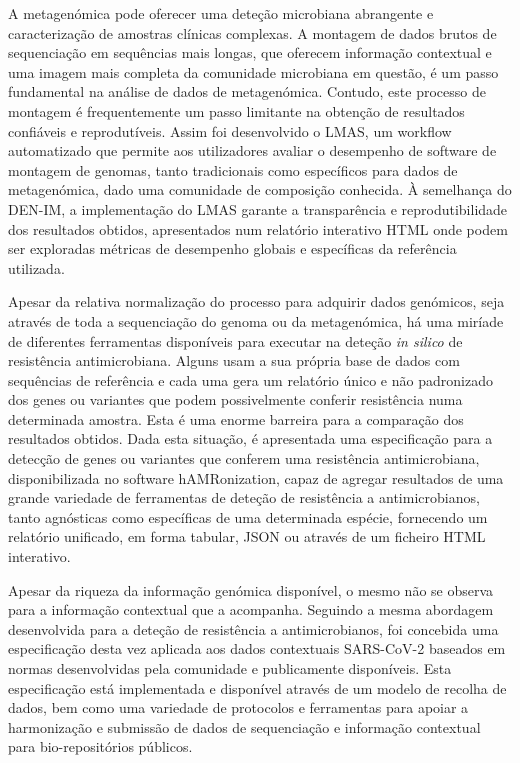 A metagenómica pode oferecer uma deteção microbiana abrangente e caracterização de amostras clínicas complexas. A montagem de dados brutos de sequenciação em sequências mais longas, que oferecem informação contextual e uma imagem mais completa da comunidade microbiana em questão, é um passo fundamental na análise de dados de metagenómica. Contudo, este processo de montagem é frequentemente um passo limitante na obtenção de resultados confiáveis e reprodutíveis. Assim foi desenvolvido o LMAS, um workflow automatizado que permite aos utilizadores avaliar o desempenho de software de montagem de genomas, tanto tradicionais como específicos para dados de metagenómica, dado uma comunidade de composição conhecida. À semelhança do DEN-IM, a implementação do LMAS garante a transparência e reprodutibilidade dos resultados obtidos, apresentados num relatório interativo HTML onde podem ser exploradas métricas de desempenho globais e específicas da referência utilizada. 

Apesar da relativa normalização do processo para adquirir dados genómicos, seja através de toda a sequenciação do genoma ou da metagenómica, há uma miríade de diferentes ferramentas disponíveis para executar na deteção \textit{in silico} de resistência antimicrobiana. Alguns usam a sua própria base de dados com sequências de referência e cada uma gera um relatório único e não padronizado dos genes ou variantes que podem possivelmente conferir resistência numa determinada amostra. Esta é uma enorme barreira para a comparação dos resultados obtidos. Dada esta situação, é apresentada uma especificação para a detecção de genes ou variantes que conferem uma resistência antimicrobiana, disponibilizada no software hAMRonization, capaz de agregar resultados de uma grande variedade de ferramentas de deteção de resistência a antimicrobianos, tanto agnósticas como específicas de uma determinada espécie, fornecendo um relatório unificado, em forma tabular, JSON ou através de um ficheiro HTML interativo. 

Apesar da riqueza da informação genómica disponível, o mesmo não se observa para a informação contextual que a acompanha. Seguindo a mesma abordagem desenvolvida para a deteção de resistência a antimicrobianos, foi concebida uma especificação desta vez aplicada aos dados contextuais SARS-CoV-2 baseados em normas desenvolvidas pela comunidade e publicamente disponíveis. Esta especificação está implementada e disponível através de um modelo de recolha de dados, bem como uma variedade de protocolos e ferramentas para apoiar a harmonização e submissão de dados de sequenciação e informação contextual para bio-repositórios públicos. 

